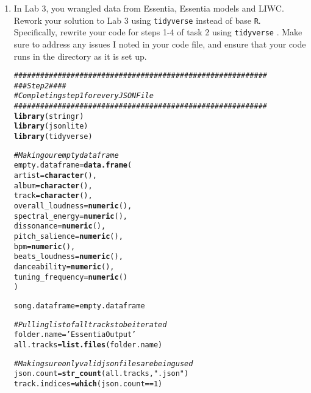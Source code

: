 \documentclass{article}\usepackage[]{graphicx}\usepackage[]{xcolor}
\makeatletter
\newcommand{\hlnum}[1]{\textcolor[rgb]{0.686,0.059,0.569}{#1}}%
\newcommand{\hlsng}[1]{\textcolor[rgb]{0.192,0.494,0.8}{#1}}%
\newcommand{\hlcom}[1]{\textcolor[rgb]{0.678,0.584,0.686}{\textit{#1}}}%
\newcommand{\hlopt}[1]{\textcolor[rgb]{0,0,0}{#1}}%
\newcommand{\hldef}[1]{\textcolor[rgb]{0.345,0.345,0.345}{#1}}%
\newcommand{\hlkwb}[1]{\textcolor[rgb]{0.69,0.353,0.396}{#1}}%
\newcommand{\hlkwc}[1]{\textcolor[rgb]{0.333,0.667,0.333}{#1}}%
\newcommand{\hlkwd}[1]{\textcolor[rgb]{0.737,0.353,0.396}{\textbf{#1}}}%
\newenvironment{kframe}{%
 \def\at@end@of@kframe{}%
 \ifinner\ifhmode%
  \def\at@end@of@kframe{\end{minipage}}%
  \begin{minipage}{\columnwidth}%
 \fi\fi%
 \def\FrameCommand##1{\hskip\@totalleftmargin \hskip-\fboxsep
 \colorbox{shadecolor}{##1}\hskip-\fboxsep
     \hskip-\linewidth \hskip-\@totalleftmargin \hskip\columnwidth}%
 \MakeFramed {\advance\hsize-\width
   \@totalleftmargin\z@ \linewidth\hsize
   \@setminipage}}%
 {\par\unskip\endMakeFramed%
 \at@end@of@kframe}
\newenvironment{knitrout}{}{} %
\makeatother
\begin{document}
\begin{enumerate}
\item In Lab 3, you wrangled data from Essentia, Essentia models and LIWC. Rework your 
solution to Lab 3 using \texttt{tidyverse} \citep{tidyverse} instead of base \texttt{R}.
Specifically, rewrite your code for steps 1-4 of task 2 using \texttt{tidyverse} \citep{tidyverse}. 
Make sure to address any issues I noted in your code file, and ensure that your code 
runs in the directory as it is set up.
\begin{knitrout}\scriptsize
{}\color{fgcolor}\begin{kframe}
\begin{alltt}
\hlcom{##########################################################}
\hlcom{###                      Step 2                       ####}
\hlcom{#Completing step 1 for every JSON File}
\hlcom{##########################################################}
\hlkwd{library}\hldef{(stringr)}
\hlkwd{library}\hldef{(jsonlite)}
\hlkwd{library}\hldef{(tidyverse)}


\hlcom{#Making our empty dataframe}
\hldef{empty.dataframe} \hlkwb{=} \hlkwd{data.frame}\hldef{(}
  \hlkwc{artist} \hldef{=} \hlkwd{character}\hldef{(),}
  \hlkwc{album} \hldef{=} \hlkwd{character}\hldef{(),}
  \hlkwc{track} \hldef{=} \hlkwd{character}\hldef{(),}
  \hlkwc{overall_loudness} \hldef{=} \hlkwd{numeric}\hldef{(),}
  \hlkwc{spectral_energy} \hldef{=} \hlkwd{numeric}\hldef{(),}
  \hlkwc{dissonance} \hldef{=} \hlkwd{numeric}\hldef{(),}
  \hlkwc{pitch_salience} \hldef{=} \hlkwd{numeric}\hldef{(),}
  \hlkwc{bpm} \hldef{=} \hlkwd{numeric}\hldef{(),}
  \hlkwc{beats_loudness} \hldef{=} \hlkwd{numeric}\hldef{(),}
  \hlkwc{danceability} \hldef{=} \hlkwd{numeric}\hldef{(),}
  \hlkwc{tuning_frequency} \hldef{=} \hlkwd{numeric}\hldef{()}
\hldef{)}

\hldef{song.dataframe} \hlkwb{=} \hldef{empty.dataframe}

\hlcom{#Pulling list of all tracks to be iterated}
\hldef{folder.name} \hlkwb{=} \hlsng{'EssentiaOutput'}
\hldef{all.tracks} \hlkwb{=} \hlkwd{list.files}\hldef{(folder.name)}

\hlcom{#Making sure only valid json files are being used}
\hldef{json.count} \hlkwb{=} \hlkwd{str_count}\hldef{(all.tracks,} \hlsng{".json"}\hldef{)}
\hldef{track.indices} \hlkwb{=} \hlkwd{which}\hldef{(json.count} \hlopt{==} \hlnum{1}\hldef{)}



\end{alltt}
\end{kframe}
\end{knitrout}
\end{enumerate}
\end{document}
